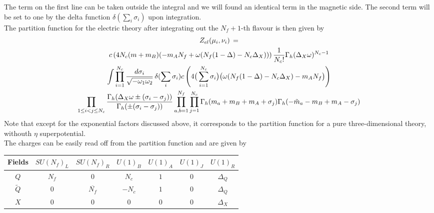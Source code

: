 The term on the first line can be taken outside the integral and we will found an identical term in the magnetic side.
The second term will be set to one by the delta function $\delta(\sum_i \sigma_i)$ upon integration.\\
The partition function for the electric theory after integrating out the $N_f +1$-th flavour is then given by
\begin{multline}
 Z_{el} ( \mu_i , \nu_i )\,  =  \\
 c \left( 4 N_c  ( m  + m_B ) (-  m_A N_f   + \omega ( N_f (1 - \Delta)  - N_c \Delta_X ) ) \right) 
 {1 \over N_c ! }
\Gamma_h ( \Delta_X \omega )^{N_c-1} 
\\ \int
\prod_{i=1}^{N_c} \frac{d \sigma_i}{\sqrt{- \omega_1 \omega_2}} \, \delta( \sum_i \sigma_i)  c \left( 4\big( \sum_{i=1}^{N_c}  \sigma_i  \big) \big( \omega( N_f (1 - \Delta)  - N_c \Delta_X)  -  m_A N_f \big) \right) 
\\
   \prod_{ 1 \leq i<j \leq N_c} \frac{ \Gamma_h( \Delta_X \omega \pm (\sigma_i - \sigma_j)) }{ \Gamma_h ( \pm (\sigma_i - \sigma_j) )}
 \prod_{a,b=1}^{N_f} \prod_{j=1}^{N_c} \Gamma_h ( m_a + m_B + m_A + \sigma_j) \Gamma_h ( -\tilde{m}_a -m_B + m_A - \sigma_j)
\end{multline}
Note that except for the exponential factors discussed above, it corresponds to the partition function for a pure three-dimensional theory, withouth $\eta$ superpotential.\\
The charges can be easily read off from the partition function and are given by 
\begin{table}[h!]
 \begin{tabular}{|c |c |c |c |c |c |c |}
\hline
Fields & $SU(N_f)_L$ & $SU(N_f)_R$ & $U(1)_B$ & $U(1)_A$ & $U(1)_J$ & $U(1)_R $ \\
\hline
$Q$ & $N_f$ & 0  &$ N_c $& $1 $& 0  & $\Delta_Q$ \\
$\tilde{Q} $  & 0  &$\overline{N_f}$ & $ - N_c $& $1 $ & 0 & $\Delta_Q$ \\
$X$ & 0 & 0 & 0 & 0 &0 & $\Delta_X$ \\
\hline
\end{tabular}
\centering
\end{table}






































